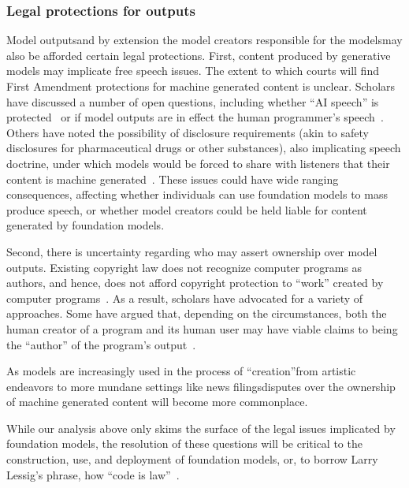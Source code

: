\subsubsection{Legal protections for outputs}
Model outputs\dash{}and by extension the model creators responsible for the models\dash{}may also be afforded certain legal protections. 
First, content produced by generative models may implicate free speech issues. 
The extent to which courts will find First Amendment protections for machine generated content is unclear.
Scholars have discussed a number of open questions, including whether ``AI speech'' is protected~\citep{massaro2016siri} or if model outputs are in effect the human programmer’s speech~\citep{kajbaf2019first}. Others have noted the possibility of disclosure requirements (akin to safety disclosures for pharmaceutical drugs or other substances), also implicating speech doctrine, under which models would be forced to share with listeners that their content is machine generated~\citep{lamo2019regulating}. 
These issues could have wide ranging consequences, affecting whether individuals can use foundation models to mass produce speech, or whether model creators could be held liable for content generated by foundation models.

Second, there is uncertainty regarding who may assert ownership over model outputs.  Existing copyright law does not recognize computer programs as authors, and hence, does not afford copyright protection to ``work'' created by computer programs~\citep{grimmelmann2015there}. As a result, scholars have advocated for a variety of approaches. Some have argued that, depending on the circumstances, both the human creator of a program and its human user may have viable claims to being the ``author'' of the program’s output~\citep{ginsburg2019authors}. 

As models are increasingly used in the process of ``creation''\dash{}from artistic endeavors to more mundane settings like news filings\dash{}disputes over the ownership of machine generated content will become more commonplace.

While our analysis above only skims the surface of the legal issues implicated by foundation models, the resolution of these questions will be critical to the construction, use, and deployment of foundation models, or, to borrow Larry Lessig’s phrase, how “code is law”~\citep{code_is_law}.
